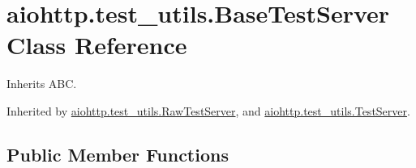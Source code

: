 \hypertarget{classaiohttp_1_1test__utils_1_1_base_test_server}{}\section{aiohttp.\+test\+\_\+utils.\+Base\+Test\+Server Class Reference}
\label{classaiohttp_1_1test__utils_1_1_base_test_server}


Inherits A\+BC.



Inherited by \hyperlink{classaiohttp_1_1test__utils_1_1_raw_test_server}{aiohttp.\+test\+\_\+utils.\+Raw\+Test\+Server}, and \hyperlink{classaiohttp_1_1test__utils_1_1_test_server}{aiohttp.\+test\+\_\+utils.\+Test\+Server}.

\subsection*{Public Member Functions}
